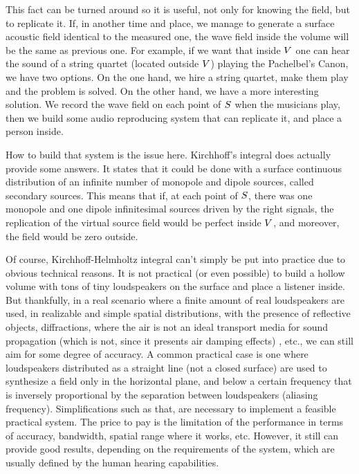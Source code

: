 This fact can be turned around so it is useful, not only for knowing the field, but to replicate it.
If, in another time and place, we manage to generate a surface acoustic field identical to the measured one, the wave field inside the volume will be the same as previous one.
For example, if we want that inside $V$ one can hear the sound of a string quartet (located outside $V$) playing the Pachelbel's Canon, we have two options. On the one hand, we hire a string quartet, make them play and the problem is solved. On the other hand, we have a more interesting solution. We record the wave field on each point of $S$ when the musicians play, then we build some audio reproducing system that can replicate it, and place a person inside.

How to build that system is the issue here. Kirchhoff's integral does actually provide some answers. It states that it could be done with a surface continuous distribution of an infinite number of monopole and dipole sources, called secondary sources. This means that if, at each point of $S$, there was one monopole and one dipole infinitesimal sources driven by the right signals, the replication of the virtual source field would be perfect inside $V$, and moreover, the field would be zero outside.

Of course, Kirchhoff-Helmholtz integral can't simply be put into practice due to obvious technical reasons. It is not practical (or even possible) to build a hollow volume with tons of tiny loudspeakers on the surface and place a listener inside.
But thankfully, in a real scenario where a finite amount of real loudspeakers are used, in realizable and simple spatial distributions, with the presence of reflective objects, diffractions, where the air is not an ideal transport media for sound propagation (which is not, since it presents air damping effects)%
, etc., we can still aim for some degree of accuracy.
A common practical case is one where loudspeakers distributed as a straight line (not a closed surface) are used to synthesize a field only in the horizontal plane, and below a certain frequency that is inversely proportional by the separation between loudspeakers (aliasing frequency). Simplifications such as that, are necessary to implement a feasible practical system. The price to pay is the limitation of the performance in terms of accuracy, bandwidth, spatial range where it works, etc. However, it still can provide good results, depending on the requirements of the system, which are usually defined by the human hearing capabilities.

